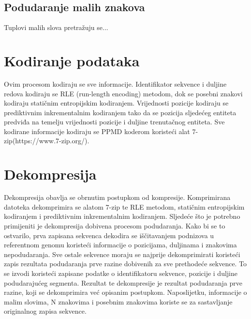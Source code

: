 \subsection{Podudaranje malih znakova}
Tuplovi malih slova pretražuju se...

\section{Kodiranje podataka}
Ovim procesom kodiraju se sve informacije. Identifikator sekvence i duljine redova kodiraju se RLE (run-length encoding) metodom, dok se posebni znakovi kodiraju statičnim entropijskim kodiranjem. Vrijednosti pozicije kodiraju se prediktivnim inkrementalnim kodiranjem tako da se pozicija sljedećeg entiteta predviđa na temelju vrijednosti pozicije i duljine trenutačnog entiteta. Sve kodirane informacije kodiraju se PPMD koderom koristeći alat 7-zip(https://www.7-zip.org/).

\section{Dekompresija}
Dekompresija obavlja se obrnutim postupkom od kompresije. Komprimirana datoteka dekomprimira se alatom 7-zip te RLE metodom, statičnim entropijskim kodiranjem i prediktivnim inkrementalnim kodiranjem. Sljedeće što je potrebno primijeniti je dekompresija dobivena procesom podudaranja. Kako bi se to ostvarilo, prva zapisana sekvenca dekodira se iščitavanjem podnizova u referentnom genomu koristeći informacije o pozicijama, duljinama i znakovima nepodudaranja. Sve ostale sekvence moraju se najprije dekomprimirati koristeći zapis rezultata podudaranja prve razine dobivenih za sve prethodeće sekvence. To se izvodi koristeći zapisane podatke o identifikatoru sekvence, pozicije i duljine podudarajućeg segmenta. Rezultat te dekompresije je rezultat podudaranja prve razine, koji se dekomprimira već opisanim postupkom. Naposlijetku, informacije o malim slovima, N znakovima i posebnim znakovima koriste se za sastavljanje originalnog zapisa sekvence.

